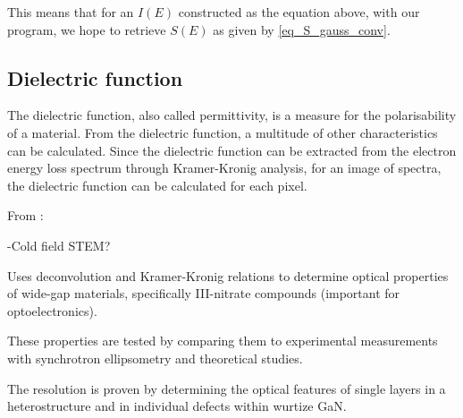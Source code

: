 
This means that for an $I(E)$ constructed as the equation above, with our program, we hope to retrieve $S(E)$ as given by \eqref{eq_S_gauss_conv}.


\subsection{Dielectric function}

The dielectric function, also called permittivity, is a measure for the polarisability of a material. From the dielectric function, a multitude of other characteristics can be calculated. Since the dielectric function can be extracted from the electron energy loss spectrum through Kramer-Kronig analysis, for an image of spectra, the dielectric function can be calculated for each pixel. \cite{egerton_book}



From \cite{brockt_lakner_2000}:

-Cold field STEM?


Uses deconvolution and Kramer-Kronig relations to determine optical properties of wide-gap materials, specifically III-nitrate compounds (important for optoelectronics).

These properties are tested by comparing them to experimental measurements with synchrotron ellipsometry and theoretical studies.

The resolution is proven by determining the optical features of single layers in a heterostructure and in individual defects within wurtize GaN.


